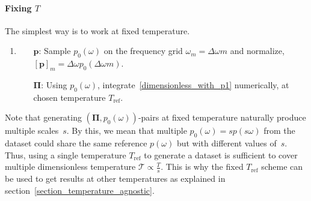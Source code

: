 \documentclass[notitlepage,11pt,nofootinbib]{revtex4-1}
\renewcommand{\vec}[1]{\bm{#1}}
\begin{document}
\paragraph*{Fixing $T$}
The simplest way is to work at fixed temperature.
\begin{enumerate}
    \item \label{fixT}
    \begin{itemize}
        \item[$\vec p$:] Sample $p_0(\omega)$ on the frequency grid $\omega_m=\Delta\omega m$ and normalize, $[\vec p]_m = \Delta\omega p_0(\Delta\omega m)$.
        \item[$\vec \Pi$:] Using $p_0(\omega)$, integrate~\eqref{dimensionless_with_p1} numerically, at chosen temperature $T_{\text{ref}}$.
    \end{itemize}
\end{enumerate}
Note that generating $(\vec\Pi, p_0(\omega))$-pairs at fixed temperature naturally produce multiple scales~$s$. By this, we mean that multiple $p_0(\omega)=sp(s\omega)$ from the dataset could share the same reference $p(\omega)$ but with different values of~$s$.
Thus, using a single temperature $T_{\text{ref}}$ to generate a dataset is sufficient to cover multiple dimensionless temperature $\mathcal T\propto\frac{T}{s}$. This is why the fixed $T_{\text{ref}}$ scheme can be used to get results at other temperatures as explained in section~\ref{section_temperature_agnostic}.
\end{document}

